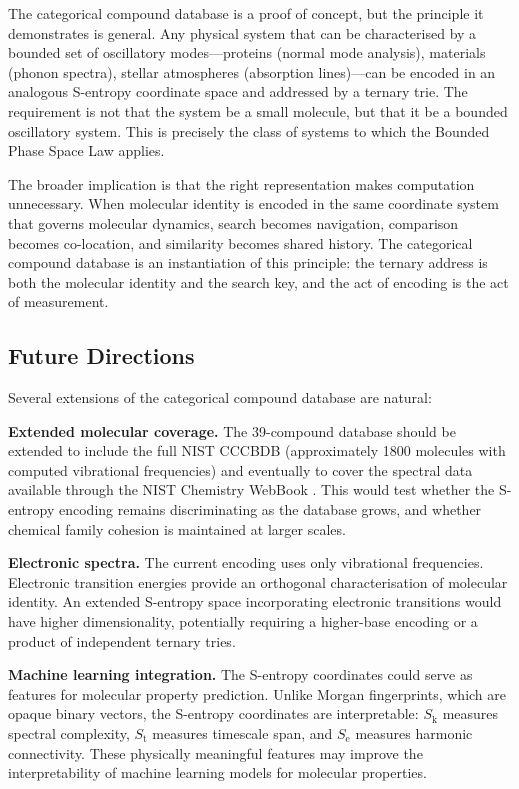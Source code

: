 \documentclass[11pt,a4paper]{article}
\theoremstyle{definition}
\theoremstyle{remark}
\newcommand{\Sk}{S_{\mathrm{k}}}
\newcommand{\St}{S_{\mathrm{t}}}
\newcommand{\Se}{S_{\mathrm{e}}}
\begin{document}
The categorical compound database is a proof of concept, but the principle it demonstrates is general. Any physical system that can be characterised by a bounded set of oscillatory modes---proteins (normal mode analysis), materials (phonon spectra), stellar atmospheres (absorption lines)---can be encoded in an analogous S-entropy coordinate space and addressed by a ternary trie. The requirement is not that the system be a small molecule, but that it be a bounded oscillatory system. This is precisely the class of systems to which the Bounded Phase Space Law applies.

The broader implication is that the right representation makes computation unnecessary. When molecular identity is encoded in the same coordinate system that governs molecular dynamics, search becomes navigation, comparison becomes co-location, and similarity becomes shared history. The categorical compound database is an instantiation of this principle: the ternary address is both the molecular identity and the search key, and the act of encoding is the act of measurement.

\subsection{Future Directions}

Several extensions of the categorical compound database are natural:

\textbf{Extended molecular coverage.} The 39-compound database should be extended to include the full NIST CCCBDB (approximately 1800 molecules with computed vibrational frequencies) and eventually to cover the spectral data available through the NIST Chemistry WebBook \citep{linstrom2023}. This would test whether the S-entropy encoding remains discriminating as the database grows, and whether chemical family cohesion is maintained at larger scales.

\textbf{Electronic spectra.} The current encoding uses only vibrational frequencies. Electronic transition energies provide an orthogonal characterisation of molecular identity. An extended S-entropy space incorporating electronic transitions would have higher dimensionality, potentially requiring a higher-base encoding or a product of independent ternary tries.

\textbf{Machine learning integration.} The S-entropy coordinates could serve as features for molecular property prediction. Unlike Morgan fingerprints, which are opaque binary vectors, the S-entropy coordinates are interpretable: $\Sk$ measures spectral complexity, $\St$ measures timescale span, and $\Se$ measures harmonic connectivity. These physically meaningful features may improve the interpretability of machine learning models for molecular properties.
\end{document}
